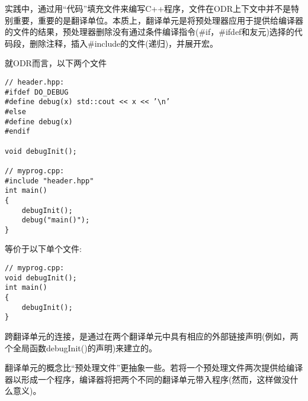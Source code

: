 实践中，通过用“代码”填充文件来编写C++程序，文件在ODR上下文中并不是特别重要，重要的是翻译单位。本质上，翻译单元是将预处理器应用于提供给编译器的文件的结果，预处理器删除没有通过条件编译指令(\#if，\#ifdef和友元)选择的代码段，删除注释，插入\#include的文件(递归)，并展开宏。

就ODR而言，以下两个文件

\begin{lstlisting}[style=styleCXX]
// header.hpp:
#ifdef DO_DEBUG
#define debug(x) std::cout << x << ’\n’
#else
#define debug(x)
#endif

void debugInit();

// myprog.cpp:
#include "header.hpp"
int main()
{
	debugInit();
	debug("main()");
}
\end{lstlisting}

等价于以下单个文件:

\begin{lstlisting}[style=styleCXX]
// myprog.cpp:
void debugInit();
int main()
{
	debugInit();
}
\end{lstlisting}

跨翻译单元的连接，是通过在两个翻译单元中具有相应的外部链接声明(例如，两个全局函数debugInit()的声明)来建立的。

翻译单元的概念比“预处理文件”更抽象一些。若将一个预处理文件两次提供给编译器以形成一个程序，编译器将把两个不同的翻译单元带入程序(然而，这样做没什么意义)。









































